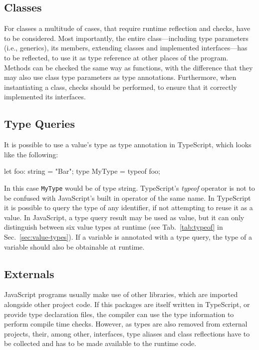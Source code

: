 \subsection{Classes}

For classes a multitude of cases, that require runtime reflection and checks, have to be considered. Most importantly, the entire class---including type parameters (i.e., generics), its members, extending classes and implemented interfaces---has to be reflected, to use it as type reference at other places of the program. Methods can be checked the same way as functions, with the difference that they may also use class type parameters as type annotations. Furthermore, when instantiating a class, checks should be performed, to ensure that it correctly implemented its interfaces.


\subsection{Type Queries}

It is possible to use a value's type as type annotation in TypeScript, which looks like the following:
\begin{JsCode}[numbers=none]
let foo: string = "Bar";
type MyType = typeof foo;
\end{JsCode}
In this case \texttt{MyType} would be of type string. TypeScript's \emph{typeof} operator is not to be confused with JavaScript's built in operator of the same name. In TypeScript it is possible to query the type of any identifier, if not attempting to reuse it as a value. In JavaScript, a type query result may be used as value, but it can only distinguish between six value types at runtime (see Tab.~\ref{tab:typeof} in Sec.~\ref{sec:value-types}). If a variable is annotated with a type query, the type of a variable should also be obtainable at runtime.

\subsection{Externals}

JavaScript programs usually make use of other libraries, which are imported alongside 
other project code. If this packages are itself written in TypeScript, or provide type declaration files, the compiler can use the type information to perform compile time checks. However, as types are also removed from external projects, their, among other, interfaces, type aliases and class reflections have to be collected and has to be made available to the runtime code.

